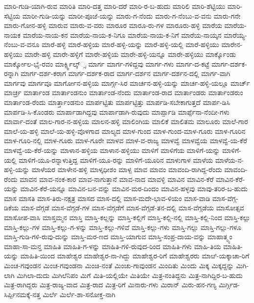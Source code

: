 ಮಾರಿ-ಗುಡಿ-ಯಾಗಿ-ರುವ
ಮಾರಿತಿ
ಮಾರಿ-ದತ್ತ
ಮಾರಿ-ದರೆ
ಮಾರಿ-ರ-ಬ-ಹುದು
ಮಾರಿಲಿ
ಮಾರಿ-ಶೆಟ್ಟಿಯು
ಮಾರಿ-ಸೆಟ್ಟಿಯ
ಮಾರೀ-ಗುಡಿ-ಯನ್ನು
ಮಾರೀ-ಪೂಜೆ-ಯನ್ನು
ಮಾರು-ಗ-ನೆಂದು
ಮಾರು-ಗ-ನೆಂಬು-ವ-ವನು
ಮಾರು-ಗನೇ
ಮಾರು-ಗೋನ-ಹಳ್ಳಿ
ಮಾರುವ
ಮಾರು-ವ-ವರು
ಮಾರೂರ
ಮಾರೂ-ರು-ಗಳ
ಮಾರೂರು-ಹಳ್ಳಿ
ಮಾರೆಯ
ಮಾರೆಯ-ನಾಯಕ
ಮಾರೆಯ-ನಾಯ-ಕನ
ಮಾರೆಯ-ನಾಯ-ಕ-ನಿಗೂ
ಮಾರೆಯ-ನಾಯ-ಕ-ನಿಗೆ
ಮಾರೆಯ-ನಾಯ್ಕನ
ಮಾರೆಯ್ಯ-ನೆಂಬು-ವ-ವನೂ
ಮಾರೆ-ಹಳ್ಳಿ
ಮಾರೆ-ಹಳ್ಳಿಯ
ಮಾರೆ-ಹಳ್ಳಿ-ಯನ್ನು
ಮಾರೆ-ಹಳ್ಳಿ-ಯಲ್ಲಿ
ಮಾರೆ-ಹಳ್ಳಿಯು
ಮಾರೇನ-ಹಳ್ಳಿಯು
ಮಾರೇ-ಹಳ್ಳಿ
ಮಾರೇ-ಹಳ್ಳಿಗೆ
ಮಾರೇ-ಹಳ್ಳಿಯ
ಮಾರೇ-ಹಳ್ಳಿ-ಯನ್ನೂ
ಮಾರೇ-ಹಳ್ಳಿಯು
ಮಾರ್ಕ್ಕೊಂಡು
ಮಾರ್ಕ್ಕೋಲ-ಭೈ-ರವಂ
ಮಾರ್ಕ್ಸ್ವಿಲ್ಕ್್ಸ
ಮಾರ್ಗ
ಮಾರ್ಗ-ಗಳಿದ್ದವು
ಮಾರ್ಗ-ಗಳು
ಮಾರ್ಗ-ದ-ಕಟ್ಟೆ
ಮಾರ್ಗ-ದರ್ಶಕ-ರನ್ನಾಗಿ
ಮಾರ್ಗ-ದರ್ಶ-ಕರಾಗ
ಮಾರ್ಗ-ದರ್ಶಕ-ರಾದ
ಮಾರ್ಗ-ದರ್ಶನ
ಮಾರ್ಗ-ದರ್ಶನ-ದಲ್ಲಿ
ಮಾರ್ಗ-ವಾಗಿ
ಮಾರ್ಗವು
ಮಾರ್ಗವೂ
ಮಾರ್ಗೋನ-ಹಳ್ಳಿಯ
ಮಾರ್ಗ್ಗ-ಸಿರ
ಮಾರ್ಚನ-ಹಳ್ಳಿ-ಯನ್ನು
ಮಾರ್ಚ-ಹಳ್ಳಿ-ಯಲ್ಲೂ
ಮಾರ್ಚ್
ಮಾರ್ಚ್ರ
ಮಾರ್ತಾಂಡ
ಮಾರ್ತಾಂಡನುಂ
ಮಾರ್ತಾಂಡ-ನೆಂದು
ಮಾರ್ತಾಂಡ-ರಾದ
ಮಾರ್ತಾಂಡರು
ಮಾರ್ತಾಂಡರುಂ
ಮಾರ್ತಾಂಡ-ರೆಂದು
ಮಾರ್ತ್ತಾಂಡನುಂ
ಮಾರ್ಪಟ್ಟಿತು
ಮಾರ್ಪಟ್ಟಿತ್ತು
ಮಾರ್ಪಡಿ-ಸಬೇಕಾಗುತ್ತದೆ
ಮಾರ್ಪ-ಡಿಸಿ
ಮಾರ್ಪಡಿ-ಸಿ-ಕೊಂಡರು
ಮಾರ್ಪಾಡಾಗಿದ್ದವು
ಮಾರ್ಪಾಡಾಗಿ-ರುವುದು
ಮಾರ್ಪ್ಪಾಡಿ
ಮಾರ್ಪ್ಪೆನಾ-ನೆಂದೀ-ಗಳು
ಮಾರ್ವಾ-ದಂತೆ
ಮಾಲ-ಗಾರ-ನ-ಹಳ್ಳಿಯ
ಮಾಲನ-ಹಳ್ಳಿ
ಮಾಲಿಂಗಿಯ
ಮಾಲಿಕೆ
ಮಾಲಿತಮ
ಮಾಲೂರು
ಮಾಲೆ-ಗಾರ
ಮಾಲೆ-ಯ-ಹಳ್ಳಿ
ಮಾಲೆ-ಯ-ಹಳ್ಳಿ-ವೊಳಗಾದ
ಮಾಲ್ಯದ
ಮಾಳ-ಗುಂದ
ಮಾಳ-ಗುಂದ-ಮಾಳ-ಗೂರು
ಮಾಳ-ಗೂರಿನ
ಮಾಳ-ಗೂರಿ-ನಲ್ಲಿ
ಮಾಳ-ಗೂರು
ಮಾಳ-ಗೂರೇ
ಮಾಳವ
ಮಾಳ-ವ-ರಾಜ್ಯ
ಮಾಳವ್ವೆ
ಮಾಳವ್ವೆಯ
ಮಾಳವ್ವೆ-ಯ-ಕೆರೆ
ಮಾಳವ್ವೆ-ಯ-ಕೆರೆ-ಯನ್ನು
ಮಾಳಾನ-ಹಳ್ಳಿಯ
ಮಾಳಾನ-ಹಳ್ಳಿಯು
ಮಾಳಿಗೆ
ಮಾಳಿಗೆಯ
ಮಾಳಿಗೆ-ಯನ್ನು
ಮಾಳಿಗೆ-ಯಲ್ಲಿ
ಮಾಳಿಗೆ-ಯೂ-ರನ್ನಾಳುತ್ತಿದ್ದ
ಮಾಳಿಗೆ-ಯೂ-ರನ್ನು
ಮಾಳಿಗೆ-ಯೂರಿನ
ಮಾಳುಗಾಳ
ಮಾಳೆಯ
ಮಾಳೆಯ-ನ-ಹಳ್ಳಿ-ಯನ್ನು
ಮಾಳೆಯರ
ಮಾಳೇನ-ಹಳ್ಳಿ
ಮಾಳ್ಕಧೀಶಂ
ಮಾಳ್ಪ
ಮಾವ
ಮಾವಂ
ಮಾವಂದಿ-ರಾಗಿದ್ದ-ರೆಂದು
ಮಾವಂದಿ-ರೆಂದು
ಮಾವನ
ಮಾವ-ನಂಕ-ಕಾರ
ಮಾವ-ನಾಗುತ್ತಾನೆ
ಮಾವ-ನಾದ
ಮಾವಳ್ಳಿ
ಮಾವಿನ
ಮಾವಿನ-ಕೆರೆ
ಮಾವಿನ-ಕೆರೆ-ಯನ್ನು
ಮಾವಿನ-ಕೆರೆ-ಯನ್ನೂ
ಮಾವಿನ-ಬನ-ವನ್ನು
ಮಾವಿನ-ಮರ-ದಿಂದಂ
ಮಾವಿನ-ಹಳ್ಳವು
ಮಾವು-ತರಿರ-ಬ-ಹುದು
ಮಾಸ
ಮಾಸತಿ
ಮಾಸ-ತಿರು-ನಕ್ಷತ್ರ
ಮಾಸದ
ಮಾಸ-ದಲ್ಲಿ
ಮಾಸ-ಮದೇ-ಭಾವ-ಳಿಯಂ
ಮಾಸ-ವಾಡಿ
ಮಾಸ-ವೆಗ್ಗ-ಡಿಕೆಯ
ಮಾಸ-ವೆಗ್ಗಡೆ
ಮಾಸ-ವೆಗ್ಗಡೆ-ಗಳ
ಮಾಸ-ವೆಗ್ಗಡೆಗೆ
ಮಾಸ-ವೆಗ್ಗಡೆ-ತನ-ದಲ್ಲಿ
ಮಾಸ-ವೆಗ್ಗಡೆಯ
ಮಾಸೋತ್ಸವ
ಮಾಸೋಪ-ವಾಸಿ
ಮಾಸ್ತಮ್ಮನ
ಮಾಸ್ತಿ
ಮಾಸ್ತಿ-ಕಲ್ಲನ್ನು
ಮಾಸ್ತಿ-ಕಲ್ಲಿಗೆ
ಮಾಸ್ತಿ-ಕಲ್ಲಿ-ನಲ್ಲಿ
ಮಾಸ್ತಿ-ಕಲ್ಲಿ-ನಿಂದ
ಮಾಸ್ತಿ-ಕಲ್ಲು
ಮಾಸ್ತಿ-ಕಲ್ಲು-ಗಳ
ಮಾಸ್ತಿ-ಕಲ್ಲು-ಗ-ಳನ್ನು
ಮಾಸ್ತಿ-ಕಲ್ಲು-ಗಳಿವೆ
ಮಾಸ್ತಿ-ಕಲ್ಲು-ಗಳು
ಮಾಸ್ತಿ-ಗಲ್ಲು
ಮಾಸ್ತಿ-ಗಲ್ಲು-ಗಳೂ
ಮಾಸ್ತಿ-ಗುಡಿ-ಗಳಿ-ರುವು-ದುನ್ನು
ಮಾಸ್ತಿ-ಮರ-ಣದ
ಮಾಸ್ತಿ-ಯಾಗುವ
ಮಾಸ್ತಿ-ಸಂಪ್ರ-ದಾಯ-ವನ್ನು
ಮಾಹಾತ್ಮ್ಯಂ
ಮಾಹಾ-ಸಾ-ಮನ್ತ
ಮಾಹಿತಿ
ಮಾಹಿತಿ-ಗ-ಳನ್ನು
ಮಾಹಿತಿ-ಗಳಿ-ರುವುದ-ರಿಂದ
ಮಾಹಿತಿ-ಗಳು
ಮಾಹಿ-ತಿಯ
ಮಾಹಿತಿ-ಯನ್ನು
ಮಾಹಿತಿ-ಯಿಂದ
ಮಾಹೇಶ್ವರ
ಮಾಹೇಶ್ವರ-ನಾ-ಗಿದ್ದು
ಮಾಹೇಶ್ವರ-ರಿಗೆ
ಮಾಹೇಶ್ವರರು
ಮಾೞಿ-ಯಕ್ಕಾಚಾ-ರಿಗೆ
ಮಿಂಚ-ಗವುಂಡನ
ಮಿಂಚ-ಗವುಂಡನಾ
ಮಿಂಚಿ-ನಂತೆ
ಮಿಂಚು-ಗಾವುಂಡನ
ಮಿಂದಿತು
ಮಿಂದು
ಮಿಕ್ಕ
ಮಿಕ್ಕದ್ದನ್ನು
ಮಿಗಿ-ಲಾಗಿ
ಮಿಗಿಲಾ-ದುದು
ಮಿಗಿಲೆನಿಪಂ
ಮಿಗೆ
ಮಿತಿ-ಯಲ್ಲಿಯೇ
ಮಿತಿಯೇ
ಮಿತ್ರ-ನಂತಿದ್ದನು
ಮಿತ್ರ-ನಾಗಿದ್ದಿರ-ಬ-ಹುದು
ಮಿತ್ರ-ರಾಗಿದ್ದರು
ಮಿತ್ರ-ರಾಜ್ಯ-ವಾದ
ಮಿತ್ರ-ರಾದ
ಮಿತ್ರ-ರಿಗೆ
ಮಿನಾರು-ಗಳು
ಮಿರಾನ್
ಮಿರು-ಹನ-ಗಣ್ಯ
ಮಿರ್ಗ್ಗಿಡ-ಸಿರ್ಪ್ಪಿನಮಕ್ಕೆ-ನತ್ತ
ಮಿರ್ಲೆ
ಮಿರ್ಲೆ-ಶಾ-ಸನೋಕ್ತ-ನಾಗಿ

